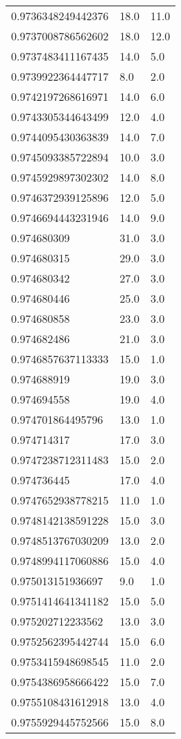 \begin{center}
\begin{supertabular}[H]{p{0.30\textwidth}p{0.05\textwidth}p{0.05\textwidth}}
0.9736348249442376 & 18.0 & 11.0 \\ 
0.9737008786562602 & 18.0 & 12.0 \\ 
0.9737483411167435 & 14.0 & 5.0 \\ 
0.9739922364447717 & 8.0 & 2.0 \\ 
0.9742197268616971 & 14.0 & 6.0 \\ 
0.9743305344643499 & 12.0 & 4.0 \\ 
0.9744095430363839 & 14.0 & 7.0 \\ 
0.9745093385722894 & 10.0 & 3.0 \\ 
0.9745929897302302 & 14.0 & 8.0 \\ 
0.9746372939125896 & 12.0 & 5.0 \\ 
0.9746694443231946 & 14.0 & 9.0 \\ 
0.974680309 & 31.0 & 3.0 \\ 
0.974680315 & 29.0 & 3.0 \\ 
0.974680342 & 27.0 & 3.0 \\ 
0.974680446 & 25.0 & 3.0 \\ 
0.974680858 & 23.0 & 3.0 \\ 
0.974682486 & 21.0 & 3.0 \\ 
0.9746857637113333 & 15.0 & 1.0 \\ 
0.974688919 & 19.0 & 3.0 \\ 
0.974694558 & 19.0 & 4.0 \\ 
0.974701864495796 & 13.0 & 1.0 \\ 
0.974714317 & 17.0 & 3.0 \\ 
0.9747238712311483 & 15.0 & 2.0 \\ 
0.974736445 & 17.0 & 4.0 \\ 
0.9747652938778215 & 11.0 & 1.0 \\ 
0.9748142138591228 & 15.0 & 3.0 \\ 
0.9748513767030209 & 13.0 & 2.0 \\ 
0.9748994117060886 & 15.0 & 4.0 \\ 
0.975013151936697 & 9.0 & 1.0 \\ 
0.9751414641341182 & 15.0 & 5.0 \\ 
0.975202712233562 & 13.0 & 3.0 \\ 
0.9752562395442744 & 15.0 & 6.0 \\ 
0.9753415948698545 & 11.0 & 2.0 \\ 
0.9754386958666422 & 15.0 & 7.0 \\ 
0.9755108431612918 & 13.0 & 4.0 \\ 
0.9755929445752566 & 15.0 & 8.0 \\ 

\end{supertabular}
\end{center}
